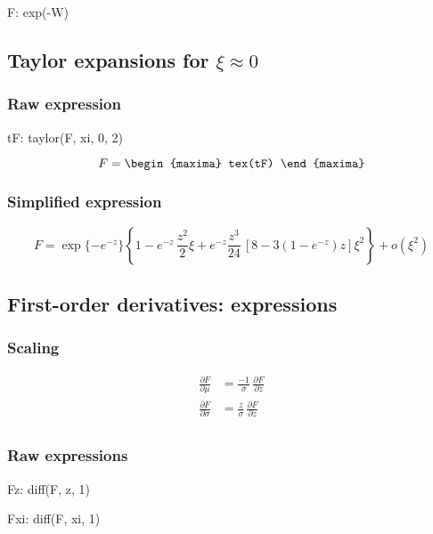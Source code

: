\begin{maxima}
  F: exp(-W)
\end{maxima}

\subsection{Taylor expansions for $\xi \approx 0$}
\subsubsection*{Raw expression}

\begin{maxima}
  tF: taylor(F, xi, 0, 2)
\end{maxima}

{\color{MonVertF}  
\begin{equation*}
  F =
  \begin{maxima}
    tex(tF)
  \end{maxima}
\end{equation*}
}
\subsubsection*{Simplified expression}
{\color{red}
$$
F = \exp\{-e^{-z}\} \left\{ 1 - e^{-z} \,\frac{z^2}{2} \xi +
  e^{-z} \frac{z^3}{24} \,\left[ 8 - 3 (1 - e^{-z}) z \right] \xi^2 \right\} +
  o(\xi^2)
$$}

\subsection{First-order derivatives: expressions}

\subsubsection*{Scaling}

\begin{align*}
\frac{\partial F}{\partial \mu} &= \frac{-1}{\sigma} \,\frac{\partial F}{\partial z}\\
\frac{\partial F}{\partial \sigma} &= \frac{z}{\sigma} \,\frac{\partial F}{\partial z}\\
\end{align*}

\subsubsection*{Raw expressions}

\begin{maxima}
  Fz: diff(F, z, 1)
\end{maxima}%
\begin{maxima}
  Fxi: diff(F, xi, 1)
\end{maxima}%

